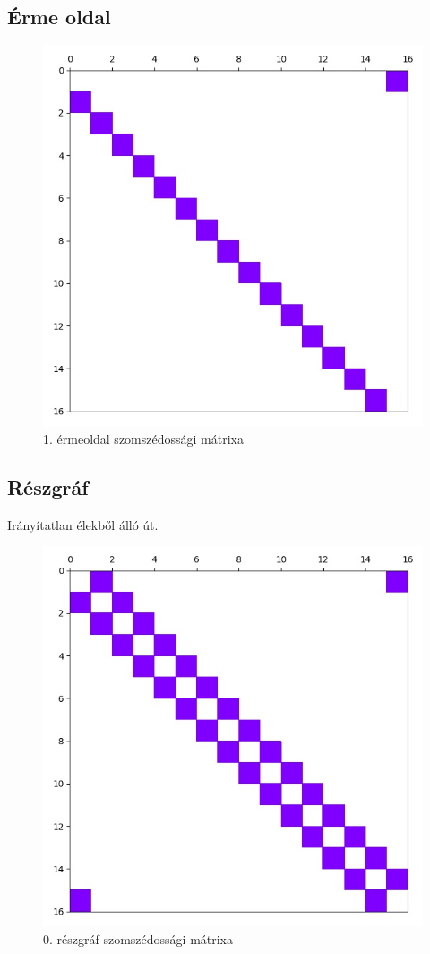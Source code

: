 \documentclass[14pt,a4paper]{article}
\begin{document}
\subsection{Érme oldal}
\begin{figure}[H]
\centering
\includegraphics[width = 0.7\columnwidth]{coin_faces/coin_face_01.jpg}
\caption{1. érmeoldal szomszédossági mátrixa}
\end{figure}
\subsection{Részgráf}
Irányítatlan élekből álló út.
\begin{figure}[H]
\centering
\includegraphics[width = 0.7\columnwidth]{graph/sub_graph_00.jpg}
\caption{0. részgráf szomszédossági mátrixa}
\end{figure}
\end{document}
